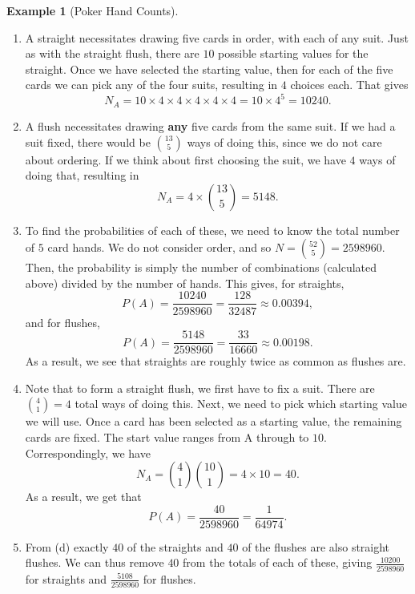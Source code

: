 \documentclass[
  letterpaper,
  DIV=11,
  numbers=noendperiod]{scrreprt}
\theoremstyle{definition}
\theoremstyle{definition}
\theoremstyle{definition}
\newtheorem{example}{Example}[chapter]
\theoremstyle{remark}
\begin{document}
\begin{example}[Poker Hand
Counts]
\begin{tcolorbox}[enhanced jigsaw, colback=white, breakable, rightrule=.15mm, leftrule=.75mm, toprule=.15mm, left=2mm, arc=.35mm, opacityback=0, bottomrule=.15mm]
\begin{enumerate}
\def\labelenumi{\alph{enumi}.}
\item
  A straight necessitates drawing five cards in order, with each of any
  suit. Just as with the straight flush, there are \(10\) possible
  starting values for the straight. Once we have selected the starting
  value, then for each of the five cards we can pick any of the four
  suits, resulting in \(4\) choices each. That gives
  \[N_A = 10\times 4\times 4\times 4\times 4\times 4 = 10\times 4^5 = 10240.\]
\item
  A flush necessitates drawing \textbf{any} five cards from the same
  suit. If we had a suit fixed, there would be \({13\choose 5}\) ways of
  doing this, since we do not care about ordering. If we think about
  first choosing the suit, we have \(4\) ways of doing that, resulting
  in \[N_A = 4 \times {13 \choose 5} = 5148.\]
\item
  To find the probabilities of each of these, we need to know the total
  number of \(5\) card hands. We do not consider order, and so
  \(N = \binom{52}{5} = 2598960\). Then, the probability is simply the
  number of combinations (calculated above) divided by the number of
  hands. This gives, for straights,
  \[P(A) = \frac{10240}{2598960} = \frac{128}{32487} \approx 0.00394,\]
  and for flushes,
  \[P(A) = \frac{5148}{2598960} = \frac{33}{16660} \approx 0.00198.\] As
  a result, we see that straights are roughly twice as common as flushes
  are.\footnotemark{}
\item
  Note that to form a straight flush, we first have to fix a suit. There
  are \({4\choose 1}=4\) total ways of doing this. Next, we need to pick
  which starting value we will use. Once a card has been selected as a
  starting value, the remaining cards are fixed. The start value ranges
  from A through to \(10\). Correspondingly, we have
  \[N_A = {4\choose 1}{10 \choose 1} = 4\times10 = 40.\] As a result, we
  get that \[P(A) = \frac{40}{2598960} = \frac{1}{64974}.\]
\item
  From (d) exactly \(40\) of the straights and \(40\) of the flushes are
  also straight flushes. We can thus remove \(40\) from the totals of
  each of these, giving \(\frac{10200}{2598960}\) for straights and
  \(\frac{5108}{2598960}\) for flushes.
\end{enumerate}

\end{tcolorbox}


\end{example}
\end{document}
